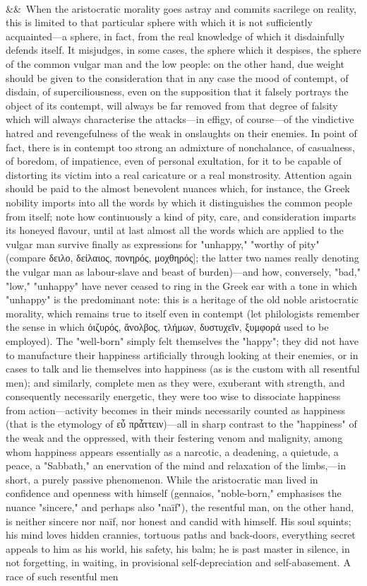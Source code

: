 \documentclass[12pt]{article}
\newcommand{\para}[1][]{\par\noindent\ifx&#1&\else\textsuperscript{\footnotesize #1}~\fi}
\begin{document}
\para When the aristocratic morality goes astray and commits sacrilege on reality, this is limited to that particular sphere with which it is not sufficiently acquainted---a sphere, in fact, from the real knowledge of which it disdainfully defends itself. It misjudges, in some cases, the sphere which it despises, the sphere of the common vulgar man and the low people: on the other hand, due weight should be given to the consideration that in any case the mood of contempt, of disdain, of superciliousness, even on the supposition that it falsely portrays the object of its contempt, will always be far removed from that degree of falsity which will always characterise the attacks---in effigy, of course---of the vindictive hatred and revengefulness of the weak in onslaughts on their enemies. In point of fact, there is in contempt too strong an admixture of nonchalance, of casualness, of boredom, of impatience, even of personal exultation, for it to be capable of distorting its victim into a real caricature or a real monstrosity. Attention again should be paid to the almost benevolent nuances which, for instance, the Greek nobility imports into all the words by which it distinguishes the common people from itself; note how continuously a kind of pity, care, and consideration imparts its honeyed flavour, until at last almost all the words which are applied to the vulgar man survive finally as expressions for "unhappy," "worthy of pity" (compare δειλο, δείλαιος, πονηρός, μοχθηρός]; the latter two names really denoting the vulgar man as labour-slave and beast of burden)---and how, conversely, "bad," "low," "unhappy" have never ceased to ring in the Greek ear with a tone in which "unhappy" is the predominant note: this is a heritage of the old noble aristocratic morality, which remains true to itself even in contempt (let philologists remember the sense in which ὀιζυρός, ἄνολβος, τλήμων, δυστυχεῑν, ξυμφορά used to be employed). The "well-born" simply felt themselves the "happy"; they did not have to manufacture their happiness artificially through looking at their enemies, or in cases to talk and lie themselves into happiness (as is the custom with all resentful men); and similarly, complete men as they were, exuberant with strength, and consequently necessarily energetic, they were too wise to dissociate happiness from action---activity becomes in their minds necessarily counted as happiness (that is the etymology of εὖ πρἆττειν)---all in sharp contrast to the "happiness" of the weak and the oppressed, with their festering venom and malignity, among whom happiness appears essentially as a narcotic, a deadening, a quietude, a peace, a "Sabbath," an enervation of the mind and relaxation of the limbs,---in short, a purely passive phenomenon. While the aristocratic man lived in confidence and openness with himself (gennaios, "noble-born," emphasises the nuance "sincere," and perhaps also "naïf"), the resentful man, on the other hand, is neither sincere nor naïf, nor honest and candid with himself. His soul squints; his mind loves hidden crannies, tortuous paths and back-doors, everything secret appeals to him as his world, his safety, his balm; he is past master in silence, in not forgetting, in waiting, in provisional self-depreciation and self-abasement. A race of such resentful men 
\end{document}
